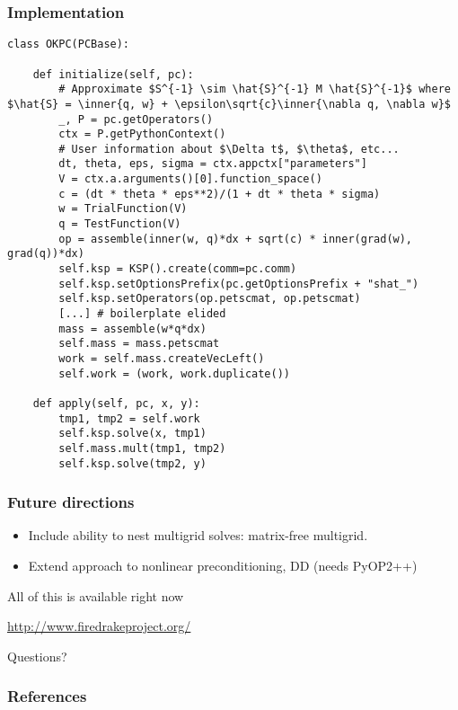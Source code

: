 \documentclass[presentation]{beamer}
\newcommand{\inner}[1]{\left\langle #1 \right \rangle}
\begin{document}
\begin{frame}[fragile]
  \frametitle{Implementation}
\begin{verbatim}
class OKPC(PCBase):

    def initialize(self, pc):
        # Approximate $S^{-1} \sim \hat{S}^{-1} M \hat{S}^{-1}$ where $\hat{S} = \inner{q, w} + \epsilon\sqrt{c}\inner{\nabla q, \nabla w}$
        _, P = pc.getOperators()
        ctx = P.getPythonContext()
        # User information about $\Delta t$, $\theta$, etc...
        dt, theta, eps, sigma = ctx.appctx["parameters"]
        V = ctx.a.arguments()[0].function_space()
        c = (dt * theta * eps**2)/(1 + dt * theta * sigma)
        w = TrialFunction(V)
        q = TestFunction(V)
        op = assemble(inner(w, q)*dx + sqrt(c) * inner(grad(w), grad(q))*dx)
        self.ksp = KSP().create(comm=pc.comm)
        self.ksp.setOptionsPrefix(pc.getOptionsPrefix + "shat_")
        self.ksp.setOperators(op.petscmat, op.petscmat)
        [...] # boilerplate elided
        mass = assemble(w*q*dx)
        self.mass = mass.petscmat
        work = self.mass.createVecLeft()
        self.work = (work, work.duplicate())

    def apply(self, pc, x, y):
        tmp1, tmp2 = self.work
        self.ksp.solve(x, tmp1)
        self.mass.mult(tmp1, tmp2)
        self.ksp.solve(tmp2, y)
\end{verbatim}
\end{frame}

\begin{frame}
  \frametitle{Future directions}
  \begin{itemize}
  \item Include ability to nest multigrid solves: matrix-free multigrid.
  \item Extend approach to nonlinear preconditioning, DD (needs PyOP2++)
  \end{itemize}
  \begin{center}
    All of this is available right now

    \url{http://www.firedrakeproject.org/}
  \end{center}
\end{frame}

\begin{frame}[standout]
  Questions?
\end{frame}

\appendix
\begin{frame}[t,allowframebreaks]
  \frametitle{References}
  \printbibliography[heading=none]
\end{frame}
\end{document}
